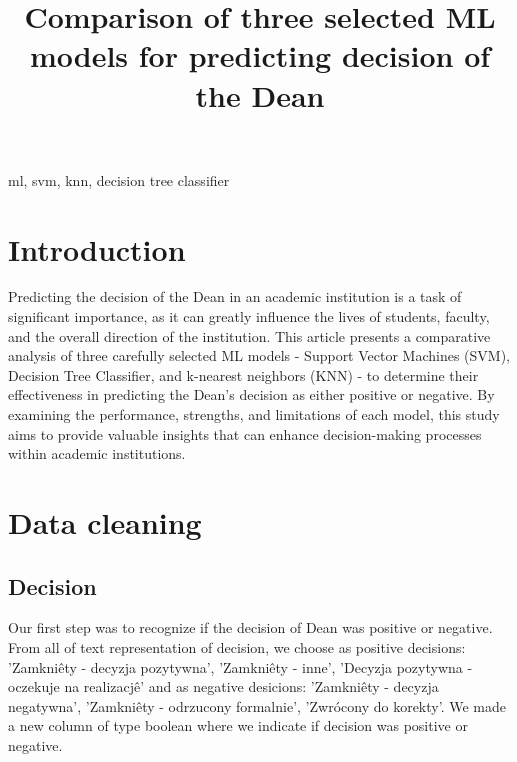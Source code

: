 \documentclass[conference]{IEEEtran}
\begin{document}
\title{Comparison of three selected ML models for predicting decision of the Dean}

\author{
\and
{}
}

\maketitle

\begin{abstract}
\end{abstract}

\begin{IEEEkeywords}
ml, svm, knn, decision tree classifier
\end{IEEEkeywords}

\section{Introduction}
Predicting the decision of the Dean in an academic institution is a task of significant importance, as it can greatly influence the lives of students, faculty, and the overall direction of the institution. This article presents a comparative analysis of three carefully selected ML models - Support Vector Machines (SVM), Decision Tree Classifier, and k-nearest neighbors (KNN) - to determine their effectiveness in predicting the Dean's decision as either positive or negative. By examining the performance, strengths, and limitations of each model, this study aims to provide valuable insights that can enhance decision-making processes within academic institutions.

\section{Data cleaning}

\subsection{Decision}
Our first step was to recognize if the decision of Dean was positive or negative.
From all of text representation of decision, we  choose  as positive decisions: 'Zamkniêty - decyzja pozytywna', 'Zamkniêty - inne', 'Decyzja pozytywna - oczekuje na realizacjê' and as negative desicions: 'Zamkniêty - decyzja negatywna', 'Zamkniêty - odrzucony formalnie', 'Zwrócony do korekty'.
We made a new column of type boolean where we indicate if decision was positive or negative.
\end{document}
